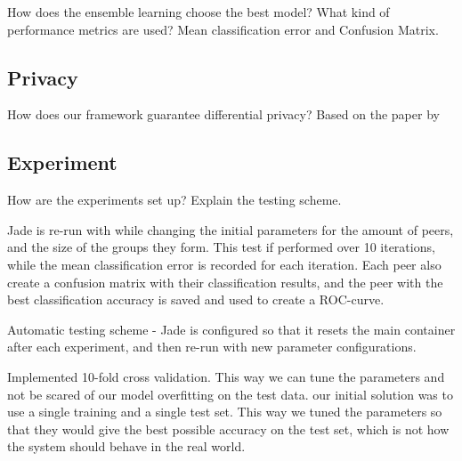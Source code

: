 How does the ensemble learning choose the best model?
What kind of performance metrics are used?
Mean classification error and Confusion Matrix.

\subsection{Privacy}
How does our framework guarantee differential privacy?
Based on the paper by 

\subsection{Experiment}
How are the experiments set up?
Explain the testing scheme.

Jade is re-run with while changing the initial parameters for the amount of peers, and the size of the groups they form. This test if performed over 10 iterations, while the mean classification error is recorded for each iteration. Each peer also create a confusion matrix with their classification results, and the peer with the best classification accuracy is saved and used to create a ROC-curve. 

Automatic testing scheme - Jade is configured so that it resets the main container after each experiment, and then re-run with new parameter configurations. 

Implemented 10-fold cross validation. This way we can tune the parameters and not be scared of our model overfitting on the test data. our initial solution was to use a single training and a single test set. This way we tuned the parameters so that they would give the best possible accuracy on the test set, which is not how the system should behave in the real world. 



\cleardoublepage